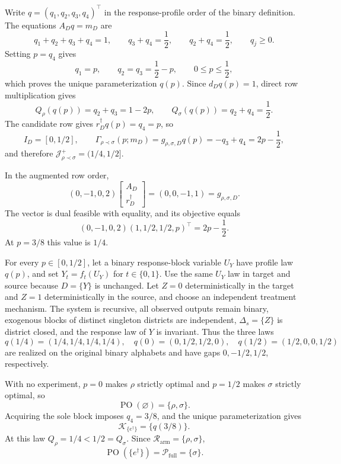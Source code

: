 Write \(q=(q_1,q_2,q_3,q_4)^\top\) in the response-profile order of the binary definition. The equations \(A_Dq=m_D\) are
\[
q_1+q_2+q_3+q_4=1,
\qquad q_3+q_4=\frac12,
\qquad q_2+q_4=\frac12,
\qquad q_j\geq0.
\]
Setting \(p=q_4\) gives
\[
q_1=p,
\qquad q_2=q_3=\frac12-p,
\qquad 0\leq p\leq\frac12,
\]
which proves the unique parameterization \(q(p)\). Since \(d_Dq(p)=1\), direct row multiplication gives
\[
Q_\rho(q(p))=q_2+q_3=1-2p,
\qquad
Q_\sigma(q(p))=q_2+q_4=\frac12.
\]
The candidate row gives \(r_D^\dagger q(p)=q_4=p\), so
\[
I_D=[0,1/2],
\qquad
\Gamma_{\rho\prec\sigma}(p;m_D)
=g_{\rho,\sigma,D}q(p)=-q_3+q_4=2p-\frac12,
\]
and therefore \(\mathcal J_{\rho\prec\sigma}^+=(1/4,1/2]\).

In the augmented row order,
\[
(0,-1,0,2)
\begin{bmatrix}A_D\\ r_D^\dagger\end{bmatrix}
=(0,0,-1,1)=g_{\rho,\sigma,D}.
\]
The vector is dual feasible with equality, and its objective equals
\[
(0,-1,0,2)(1,1/2,1/2,p)^\top=2p-\frac12.
\]
At \(p=3/8\) this value is \(1/4\).

For every \(p\in[0,1/2]\), let a binary response-block variable \(U_Y\) have profile law \(q(p)\), and set \(Y_t=f_t(U_Y)\) for \(t\in\{0,1\}\). Use the same \(U_Y\) law in target and source because \(D=\{Y\}\) is unchanged. Let \(Z=0\) deterministically in the target and \(Z=1\) deterministically in the source, and choose an independent treatment mechanism. The system is recursive, all observed outputs remain binary, exogenous blocks of distinct singleton districts are independent, \(\Delta_s=\{Z\}\) is district closed, and the response law of \(Y\) is invariant. Thus the three laws
\[
q(1/4)=(1/4,1/4,1/4,1/4),
\quad q(0)=(0,1/2,1/2,0),
\quad q(1/2)=(1/2,0,0,1/2)
\]
are realized on the original binary alphabets and have gaps \(0,-1/2,1/2\), respectively.

With no experiment, \(p=0\) makes \(\rho\) strictly optimal and \(p=1/2\) makes \(\sigma\) strictly optimal, so
\[
\operatorname{PO}(\varnothing)=\{\rho,\sigma\}.
\]
Acquiring the sole block imposes \(q_4=3/8\), and the unique parameterization gives
\[
\mathcal K_{\{e^\dagger\}}=\{q(3/8)\}.
\]
At this law \(Q_\rho=1/4<1/2=Q_\sigma\). Since \(\mathcal R_{\mathrm{arm}}=\{\rho,\sigma\}\),
\[
\operatorname{PO}(\{e^\dagger\})=\mathcal P_{\mathrm{full}}=\{\sigma\}.
\]